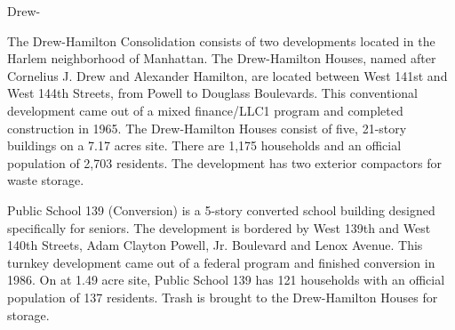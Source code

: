 Drew-

The Drew-Hamilton Consolidation consists of two developments located in the Harlem neighborhood of Manhattan. The Drew-Hamilton Houses, named after Cornelius J. Drew and Alexander Hamilton, are located between West 141st and West 144th Streets, from Powell to Douglass Boulevards. This conventional development came out of a mixed finance/LLC1 program and completed construction in 1965. The Drew-Hamilton Houses consist of five, 21-story buildings on a 7.17 acres site. There are 1,175 households and an official population of 2,703 residents. The development has two exterior compactors for waste storage.

Public School 139 (Conversion) is a 5-story converted school building designed specifically for seniors. The development is bordered by West 139th and West 140th  Streets, Adam Clayton Powell, Jr. Boulevard and Lenox Avenue. This turnkey development came out of a federal program and finished conversion in 1986. On at 1.49 acre site, Public School 139 has 121 households with an official population of 137 residents. Trash is brought to the Drew-Hamilton Houses for storage. 